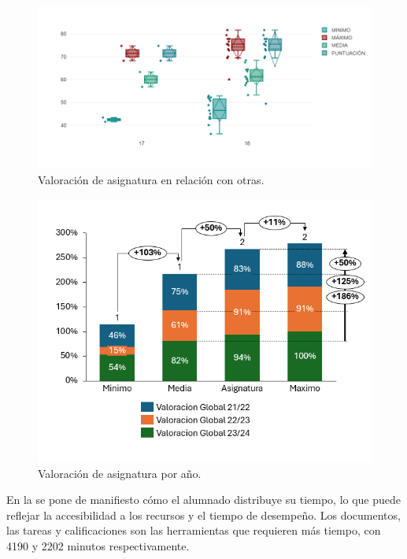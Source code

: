 \begin{figure}[htbp]
	\centering
    \begin{minipage}{.85\textwidth}
	\caption{Valoración de asignatura en relación con otras.}
	\label{fig-05}
	\includegraphics[width=\textwidth]{Imagem5.png}
    \end{minipage}
\end{figure}

\begin{figure}[htbp]
	\centering
    \begin{minipage}{.85\textwidth}
	\caption{Valoración de asignatura por año.}
	\label{fig-06}
	\includegraphics[width=\textwidth]{Imagem6.png}
    \end{minipage}
\end{figure}
	
En la  se pone de manifiesto cómo el alumnado distribuye su
tiempo, lo que puede reflejar la accesibilidad a los recursos y el
tiempo de desempeño. Los documentos, las tareas y calificaciones son las
herramientas que requieren más tiempo, con 4190 y 2202 minutos
respectivamente.

